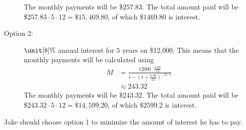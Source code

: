 \begin{problem}
\begin{subproblem}
\begin{shortsolution}
\begin{description}
 			The monthly payments will be $\$257.83$. The total amount paid will be
 			$\$257.83\cdot 5\cdot 12=\$15,469.80$, of which $\$1469.80$ is interest.
 			\item[Option 2:] $\unit[8]{\%}$ annual interest for $5$ years on \$12,000.
 			This means that the monthly payments will be calculated using
 			\begin{align*}
 				M & = \frac{12000\cdot \frac{0.08}{12}}{1-\left( 1+\frac{0.08}{12} \right)^{-12\cdot 5}} \\
 				  & \approx 243.32                                                                       
 			\end{align*}
 			The monthly payments will be $\$243.32$. The total amount paid 
 			will be $\$243.32\cdot 5\cdot 12 =\$14,599.20$, of which $\$2599.2$ is 
 			interest.
 		\end{description}
 		Jake should choose option 1 to minimize the amount of interest 
 		he has to pay.
 	\end{shortsolution}
 \end{subproblem}
 \end{problem}
  	  
